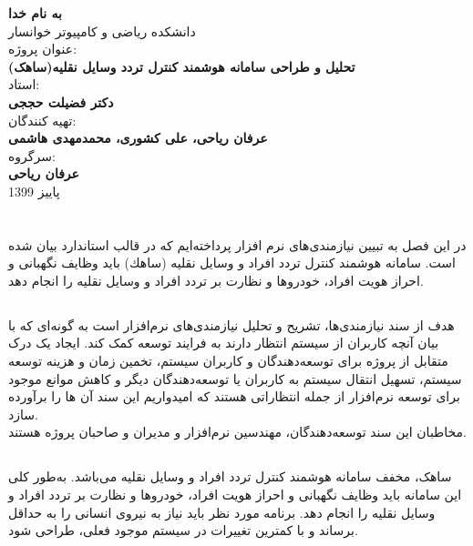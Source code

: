 \documentclass[oneside,a4paper,12pt]{book}
\begin{document}
	
	
	\thispagestyle{empty}
		\begin{center}
			\vspace*{4cm}
		\Huge{		\textbf{به نام خدا} \\}
		\Huge{		دانشکده ریاضی و کامپیوتر خوانسار \\}\vspace{1cm}
		\Large{		عنوان پروژه: \\\textbf{تحلیل و طراحی سامانه هوشمند کنترل تردد وسایل نقلیه(ساهک)}\\}\vspace{1cm}
		استاد:\\ \textbf{دکتر فضیلت حججی}\\ \vspace{1cm}
		تهیه کنندگان:\\
		\textbf{عرفان ریاحی، علی کشوری، محمدمهدی هاشمی} \\ \vspace{1cm}
		سرگروه:\\ \textbf{عرفان ریاحی}\\\vspace{1cm}
		پاییز 1399
	\end{center}
	\tableofcontents
	\listoftables
	\listoffigures
	
	\chapter{}
	در این فصل به تبیین نیازمندی‌های نرم افزار پرداخته‌ایم که در قالب استاندارد  بیان شده است. سامانه هوشمند كنترل تردد افراد و وسايل نقليه (ساهك) باید وظایف نگهبانی و احراز هویت افراد، خودروها و نظارت بر تردد افراد و وسایل نقلیه را انجام دهد.
	\section{}
	هدف از سند نیازمندی‌ها، تشریح و تحلیل نیازمندی‌های نرم‌افزار است به گونه‌ای که با بیان آنچه کاربران از سیستم
	انتظار دارند به فرایند توسعه کمک کند. ایجاد یک درک متقابل از پروژه برای توسعه‌دهندگان و کاربران سیستم، تخمین زمان و هزینه توسعه سیستم، تسهیل انتقال سیستم به کاربران یا توسعه‌دهندگان دیگر و کاهش موانع موجود برای توسعه نرم‌افزار از جمله انتظاراتی هستند که امیدواریم این سند آن ها را برآورده سازد.\\
	مخاطبان این سند توسعه‌دهندگان، مهندسین نرم‌افزار و مدیران و صاحبان پروژه هستند.
	
	\section{}
	ساهک، مخفف سامانه هوشمند کنترل تردد افراد و وسایل نقلیه می‌باشد.
	به‌طور کلی این سامانه باید وظایف نگهبانی و احراز هویت افراد، خودروها و نظارت بر تردد افراد و وسایل نقلیه را انجام دهد. برنامه مورد نظر باید نیاز به نیروی انسانی را به حداقل برساند و با کمترین تغییرات در سیستم موجود فعلی، طراحی شود.
	
\end{document}
